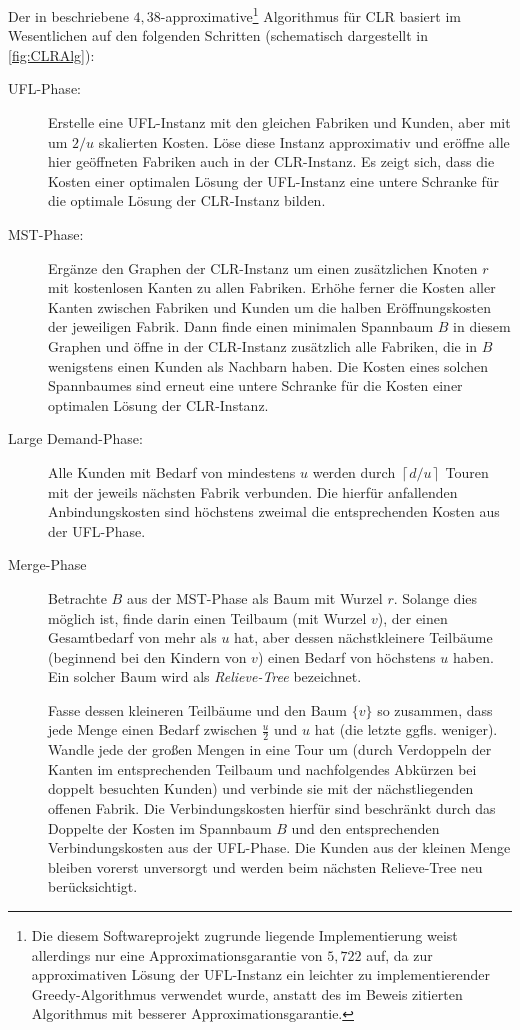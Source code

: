 \documentclass[a4paper,ngerman,11pt,bibtotoc]{scrartcl}
\theoremstyle{definition}
\theoremstyle{plain}
\theoremstyle{remark}
\newcommand{\ceil}[1]{\left\lceil#1\right\rceil}
\newcommand{\CLR}{CLR}
\newcommand{\MST}{MST}
\newcommand{\UFL}{UFL}
\begin{document}
Der in \cite{AAfCLR} beschriebene $4,38$-approximative\footnote{Die diesem Softwareprojekt zugrunde liegende Implementierung weist allerdings nur eine Approximationsgarantie von $5,722$ auf, da zur approximativen Lösung der \UFL-Instanz ein leichter zu implementierender Greedy-Algorithmus verwendet wurde, anstatt des im Beweis zitierten Algorithmus mit besserer Approximationsgarantie.} Algorithmus für \CLR{} basiert im Wesentlichen auf den folgenden Schritten (schematisch dargestellt in \cref{fig:CLRAlg}):
\begin{description}
	\item[\UFL-Phase:] Erstelle eine \UFL-Instanz mit den gleichen Fabriken und Kunden, aber mit um $2/u$ skalierten Kosten. Löse diese Instanz approximativ und eröffne alle hier geöffneten Fabriken auch in der \CLR-Instanz. Es zeigt sich, dass die Kosten einer optimalen Lösung der \UFL-Instanz eine untere Schranke für die optimale Lösung der \CLR-Instanz bilden.
	\item[\MST-Phase:] Ergänze den Graphen der \CLR-Instanz um einen zusätzlichen Knoten $r$ mit kostenlosen Kanten zu allen Fabriken. Erhöhe ferner die Kosten aller Kanten zwischen Fabriken und Kunden um die halben Eröffnungskosten der jeweiligen Fabrik. Dann finde einen minimalen Spannbaum $B$ in diesem Graphen und öffne in der \CLR-Instanz zusätzlich alle Fabriken, die in $B$ wenigstens einen Kunden als Nachbarn haben. Die Kosten eines solchen Spannbaumes sind erneut eine untere Schranke für die Kosten einer optimalen Lösung der \CLR-Instanz.
	\item[Large Demand-Phase:] Alle Kunden mit Bedarf von mindestens $u$ werden durch $\ceil{d/u}$ Touren mit der jeweils nächsten Fabrik verbunden. Die hierfür anfallenden Anbindungskosten sind höchstens zweimal die entsprechenden Kosten aus der \UFL-Phase.
	\item[Merge-Phase] Betrachte $B$ aus der \MST-Phase als Baum mit Wurzel $r$. Solange dies möglich ist, finde darin einen Teilbaum (mit Wurzel $v$), der einen Gesamtbedarf von mehr als $u$ hat, aber dessen nächstkleinere Teilbäume (beginnend bei den Kindern von $v$) einen Bedarf von höchstens $u$ haben. Ein solcher Baum wird als \emph{Relieve-Tree} bezeichnet.
	 
	Fasse dessen kleineren Teilbäume und den \glqq Baum\grqq{} $\{v\}$ so zusammen, dass jede Menge einen Bedarf zwischen $\frac{u}{2}$ und $u$ hat (die letzte ggfls. weniger). Wandle jede der großen Mengen in eine Tour um (durch Verdoppeln der Kanten im entsprechenden Teilbaum und nachfolgendes Abkürzen bei doppelt besuchten Kunden) und verbinde sie mit der nächstliegenden offenen Fabrik. Die Verbindungskosten hierfür sind beschränkt durch das Doppelte der Kosten im Spannbaum $B$ und den entsprechenden Verbindungskosten aus der \UFL-Phase. Die Kunden aus der kleinen Menge bleiben vorerst unversorgt und werden beim nächsten Relieve-Tree neu berücksichtigt.
	

\end{description}
\end{document}
